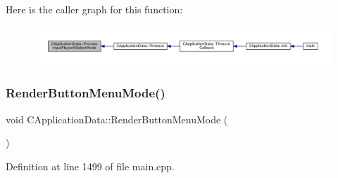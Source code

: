 Here is the caller graph for this function\+:\nopagebreak
\begin{figure}[H]
\begin{center}
\leavevmode
\includegraphics[width=350pt]{classCApplicationData_a096afda0b6459cfa73d66518ce23f68e_icgraph}
\end{center}
\end{figure}
\hypertarget{classCApplicationData_a4766e5533d32e4194816f5a4ea838bd3}{}\label{classCApplicationData_a4766e5533d32e4194816f5a4ea838bd3} 
\subsubsection{\texorpdfstring{Render\+Button\+Menu\+Mode()}{RenderButtonMenuMode()}}
{\footnotesize\ttfamily void C\+Application\+Data\+::\+Render\+Button\+Menu\+Mode (\begin{DoxyParamCaption}{ }\end{DoxyParamCaption})\hspace{0.3cm}{\ttfamily [protected]}}



Definition at line 1499 of file main.\+cpp.


